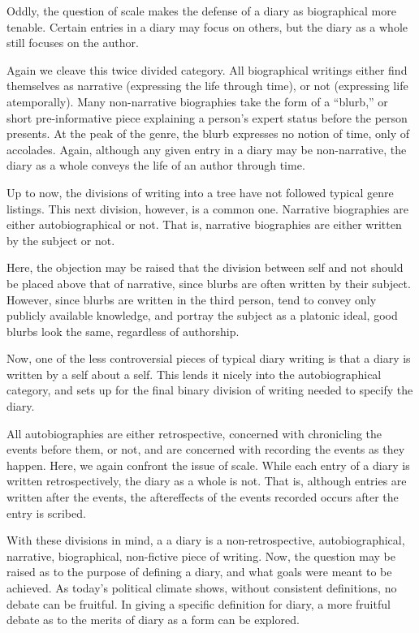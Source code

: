 \documentclass[12pt]{article}[titlepage]
\newcommand{\say}[1]{``#1''}
\newcommand{\1}{\={a}}
\newcommand{\2}{\={e}}
\newcommand{\3}{\={\i}}
\newcommand{\4}{\=o}
\newcommand{\5}{\=u}
\newcommand{\6}{\={A}}
\renewcommand{\,}{\textsuperscript{,}}
\begin{document}
Oddly, the question of scale makes the defense of a diary as biographical more tenable.
Certain entries in a diary may focus on others, but the diary as a whole still focuses on the author.

Again we cleave this twice divided category.
All biographical writings either find themselves as narrative (expressing the life through time), or not (expressing life atemporally).
Many non-narrative biographies take the form of a \say{blurb,} or short pre-informative piece explaining a person's expert status before the person presents.
At the peak of the genre, the blurb expresses no notion of time, only of accolades.
Again, although any given entry in a diary may be non-narrative, the diary as a whole conveys the life of an author through time.

Up to now, the divisions of writing into a tree have not followed typical genre listings.
This next division, however, is a common one.
Narrative biographies are either autobiographical or not.
That is, narrative biographies are either written by the subject or not.

Here, the objection may be raised that the division between self and not should be placed above that of narrative, since blurbs are often written by their subject.
However, since blurbs are written in the third person, tend to convey only publicly available knowledge, and portray the subject as a platonic ideal, good blurbs look the same, regardless of authorship.

Now, one of the less controversial pieces of typical diary writing is that a diary is written by a self about a self.
This lends it nicely into the autobiographical category, and sets up for the final binary division of writing needed to specify the diary.

All autobiographies are either retrospective, concerned with chronicling the events before them, or not, and are concerned with recording the events as they happen.
Here, we again confront the issue of scale.
While each entry of a diary is written retrospectively, the diary as a whole is not.
That is, although entries are written after the events, the aftereffects of the events recorded occurs after the entry is scribed.

With these divisions in mind, a a diary is a non-retrospective, autobiographical, narrative, biographical, non-fictive piece of writing.
Now, the question may be raised as to the purpose of defining a diary, and what goals were meant to be achieved.
As today's political climate shows, without consistent definitions, no debate can be fruitful.
In giving a specific definition for diary, a more fruitful debate as to the merits of diary as a form can be explored.
\end{document}
